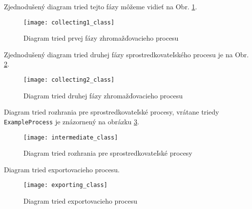 Zjednodušený diagram tried tejto fázy môžeme vidieť na Obr. \ref{o:collecting1_class}.

\begin{figure}[ht!]
\centering
\texttt{[image: collecting1\_class]}
\caption{Diagram tried prvej fázy zhromažďovacieho procesu}\label{o:collecting1_class}
\end{figure}


Zjednodušený diagram tried druhej fázy sprostredkovateľského procesu je na Obr. \ref{o:collecting2_class}.

\begin{figure}[ht!]
\centering
\texttt{[image: collecting2\_class]}
\caption{Diagram tried druhej fázy zhromažďovacieho procesu}\label{o:collecting2_class}
\end{figure}


Diagram tried rozhrania pre sprostredkovateľské procesy, vrátane triedy \verb|ExampleProcess| je znázornený
na obrázku \ref{o:intermediate_class}.

\begin{figure}[ht!]
\centering
\texttt{[image: intermediate\_class]}
\caption{Diagram tried rozhrania pre sprostredkovateľské procesy}\label{o:intermediate_class}
\end{figure}



Diagram tried exportovacieho procesu.

\begin{figure}[ht!]
\centering
\texttt{[image: exporting\_class]}
\caption{Diagram tried exportovacieho procesu}\label{o:exporting_class}
\end{figure}